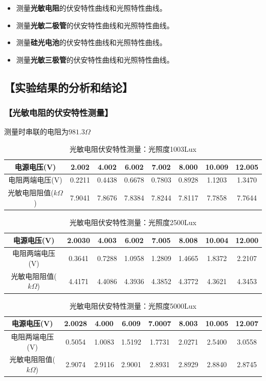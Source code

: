 \documentclass{ctexart}
\let\oldsubsection\subsection
\renewcommand{\subsection}[1]{\oldsubsection{\!\!\!\!\!\!【#1】}}
\let\oldsubsubsection\subsubsection
\renewcommand{\subsubsection}[1]{\oldsubsubsection{\!\!\!\!\!\!【#1】}}
\begin{document}
\begin{itemize}
\item 测量\textbf{光敏电阻}的伏安特性曲线和光照特性曲线。
\item 测量\textbf{光敏二极管}的伏安特性曲线和光照特性曲线。
\item 测量\textbf{硅光电池}的伏安特性曲线和光照特性曲线。
\item 测量\textbf{光敏三极管}的伏安特性曲线和光照特性曲线。
\end{itemize}

\subsection{实验结果的分析和结论}

\subsubsection{光敏电阻的伏安特性测量}

测量时串联的电阻为$981.3\Omega$

\begin{table}[H]
  \centering
  \begin{tabular}{|c|c|c|c|c|c|c|c|}
    \hline
    电源电压(V) &2.002&4.002&6.002&7.002&8.000&10.009&12.005\\\hline
    电阻两端电压(V) &0.2211&0.4438&0.6678&0.7803&0.8928&1.1203&1.3470\\\hline
    光敏电阻阻值($k\Omega$) &7.9041&7.8676&7.8384&7.8244&7.8117&7.7858&7.7644 \\\hline
  \end{tabular}
  \caption{光敏电阻伏安特性测量：光照度1003Lux}
\end{table}

\begin{table}[H]
  \centering
  \begin{tabular}{|c|c|c|c|c|c|c|c|}
    \hline
    电源电压(V) &2.0030&4.003&6.002&7.005&8.008&10.004&12.000\\\hline
    电阻两端电压(V) &0.3641&0.7288&1.0958&1.2809&1.4665&1.8372&2.2107\\\hline
    光敏电阻阻值($k\Omega$) &4.4171&4.4086&4.3936&4.3852&4.3772&4.3621&4.3453 \\\hline
  \end{tabular}
  \caption{光敏电阻伏安特性测量：光照度2500Lux}
\end{table}

\begin{table}[H]
  \centering
  \begin{tabular}{|c|c|c|c|c|c|c|c|}
    \hline
    电源电压(V) &2.0028&4.000&6.009&7.0007&8.003&10.005&12.007\\\hline
    电阻两端电压(V) &0.5054&1.0083&1.5192&1.7731&2.0271&2.5400&3.0558\\\hline
    光敏电阻阻值($k\Omega$) &2.9074&2.9116&2.9001&2.8931&2.8929&2.8840&2.8745 \\\hline
  \end{tabular}
  \caption{光敏电阻伏安特性测量：光照度5000Lux}
\end{table}
\end{document}
